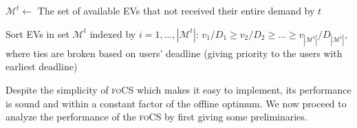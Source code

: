 \documentclass[journal]{IEEEtran}
\newcommand{\revv}[1]{{\color{black}#1}}%
\newcommand{\focs}{\textsc{foCS}\xspace}
\begin{document}
\vspace{-4mm}
\begin{algorithm}%
\footnotesize
\caption{\focs: $\forall t\in \{1,2,\dots ,T\}$}
\label{alg:focs}
\DontPrintSemicolon 



\BlankLine

$\mathcal{M}^t\leftarrow$ The set of available EVs that not received their entire demand by $t$ 

Sort EVs in set $\mathcal{M}^t$ indexed by $i=1,\dots ,|\mathcal{M}^t|$: $v_1/D_1\geq v_2/D_2\geq\dots\geq v_{|\mathcal{M}^t|}/D_{|\mathcal{M}^t|},$  \revv{where ties are broken based on users' deadline (giving priority to the users with earliest deadline) }\label{algline:sort}


\end{algorithm}
Despite the simplicity of \focs which makes it easy to implement, its performance is sound and within a constant factor of the offline optimum. We now proceed to analyze the performance of the \focs by first giving some preliminaries. 
\end{document}
